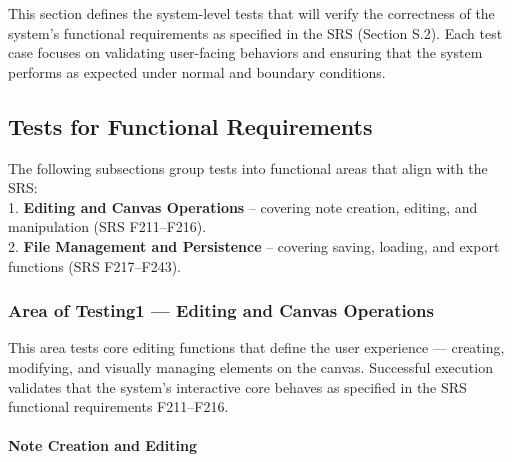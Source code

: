 \documentclass[12pt, titlepage]{article}
\begin{document}

This section defines the system-level tests that will verify the correctness of the system’s
functional requirements as specified in the SRS (Section S.2). Each test case focuses on validating
user-facing behaviors and ensuring that the system performs as expected under normal and boundary conditions.

\subsection{Tests for Functional Requirements}



The following subsections group tests into functional areas that align with the SRS: \\
1. \textbf{Editing and Canvas Operations} – covering note creation, editing, and manipulation (SRS F211–F216). \\
2. \textbf{File Management and Persistence} – covering saving, loading, and export functions (SRS F217–F243).

\subsubsection{Area of Testing1 — Editing and Canvas Operations}


This area tests core editing functions that define the user experience — creating, modifying, and visually
managing elements on the canvas. Successful execution validates that the system’s interactive core behaves
as specified in the SRS functional requirements F211–F216.

\paragraph{Note Creation and Editing}
\end{document}

